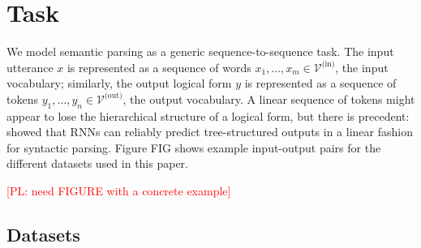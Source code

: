\documentclass[11pt,letterpaper]{article}
\newcommand{\atis}{\textsc{ATIS}\xspace}
\newcommand{\regex}{\textsc{Regex}\xspace}
\newcommand{\geo}{\textsc{Geo}\xspace}
\newcommand{\vocabin}{\mathcal{V}^{\text{(in)}}}
\newcommand{\vocabout}{\mathcal{V}^{\text{(out)}}}
\newcommand\pl[1]{\textcolor{red}{[PL: #1]}}
\begin{document}
\section{Task}
We model semantic parsing as a generic sequence-to-sequence task.
The input utterance $x$ is represented as a sequence of words $x_1, \dotsc, x_m
\in \vocabin$, the input vocabulary;
similarly, the output logical form $y$ is represented
as a sequence of tokens $y_1, \dotsc, y_n \in \vocabout$, the output vocabulary.
A linear sequence of tokens might appear to lose the hierarchical structure of a logical form,
but there is precedent: 
showed that RNNs can reliably predict tree-structured outputs
in a linear fashion for syntactic parsing.
Figure FIG shows example input-output pairs for the different
datasets used in this paper.


\pl{need FIGURE with a concrete example}

\subsection{Datasets}
\end{document}
